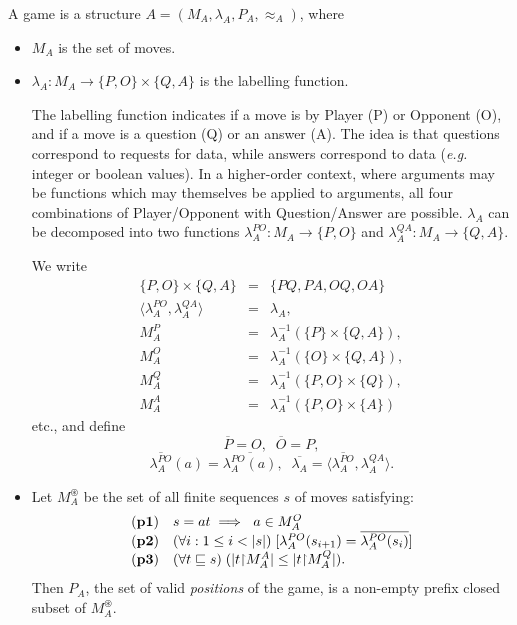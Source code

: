 \documentclass[11pt]{article}
\newcommand{\SET}[1]{\{ #1 \}}
\newcommand{\Sqleq}{\sqsubseteq}
\newcommand{\Rest}{{\upharpoonright}}
\newcommand{\La}{\lambda}
\newcommand{\Deq}{\approx}
\newcommand{\Over}[1]{\overline{ #1 }}
\newcommand{\THEN}{\; \Longrightarrow \;}
\begin{document}
A game is a structure $A = (M_A,\lambda_A,P_A,{\Deq}_A)$, where
\begin{itemize}
\item $M_A$ is the set of moves.
\item $\lambda_A: M_A \rightarrow \{ P,O \} \times \SET{Q,A}$ is the
  labelling function.

  The labelling function indicates if a move is by Player (P) or
  Opponent (O), and if a move is a question (Q) or an answer (A). The
  idea is that questions correspond to requests for data, while
  answers correspond to data
  ({\em e.g.} integer or boolean values). In a higher-order
  context, where arguments may be functions which may themselves be
  applied to arguments, all four combinations of Player/Opponent with
  Question/Answer are possible. $\lambda_A$ can be decomposed into
  two functions $\lambda_{A}^{PO}:M_A\rightarrow\{P,O\}$ and
  $\lambda_{A}^{QA}:M_A\rightarrow\{Q,A\}$.


  We write
 \[ \begin{array}{rcl}
 \{ P, O \} \times \{ Q, A \} & = & \{ PQ, PA, OQ, OA \} \\
   \langle \lambda_{A}^{PO},\lambda_{A}^{QA}
  \rangle& = & \lambda_A , \\
  M_A^P & = &  \lambda_A^{-1}(\{P \}\times\SET{Q,A}), \\
  M_A^O & = &
  \lambda_A^{-1}(\{O \}\times\SET{Q,A}), \\
  M_A^Q& = &
  \lambda_A^{-1}(\{P,O \}\times\SET{Q}), \\
  M_A^A & = &
  \lambda_A^{-1}(\{P,O \}\times\SET{A})
  \end{array}
  \]
etc., and define
\[  \overline{P} = O, \;\; \overline{O} = P, \]
\[  \overline{\La_{A}^{PO}}(a)= \overline{\La_{A}^{PO}(a)}, \;\;
  \Over{\La_{A}}= \langle \Over{\La_{A}^{PO}},\La_{A}^{QA} \rangle . \]

\item Let $M_A^{\circledast}$ be the set of all finite sequences $s$ of
  moves satisfying:
\[ \begin{array}{ll}
{\bf (p1)} &  s = at \THEN\ a \in M_A^O \\
{\bf (p2)} &  (\forall i: 1 \leq i
< |s| )\; [ \lambda_{A}^{PO}(s_{i+1}) = \overline{\lambda_{A}^{PO}(s_{i})} ] \\
{\bf (p3)} & (\forall t\Sqleq s)\;(|t\Rest M_{A}^A| \leq |t\Rest M_{A}^Q| ).
\end{array} \]
Then $P_A$, the set of valid {\em positions} of the game, is a
non-empty prefix closed subset of $M_A^{\circledast}$.


\end{itemize}
\end{document}
